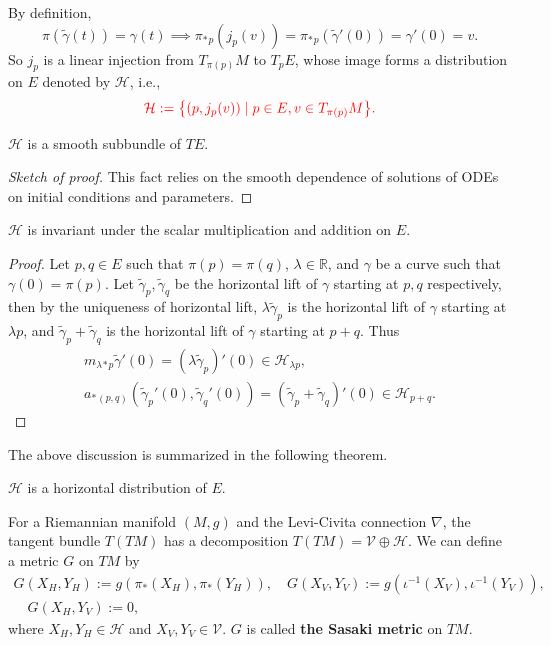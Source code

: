 By definition, 
\begin{equation*}
    \pi(\tilde{\gamma}(t)) = \gamma(t) \implies \pi_*{}_p(j_p(v)) = \pi_*{}_p(\tilde{\gamma}'(0)) = \gamma'(0) = v.
\end{equation*}
So $j_p$ is a linear injection from $T_{\pi(p)} M$ to $T_p E$, 
whose image forms a distribution on $E$ denoted by $\mathcal{H}$, i.e., 
\begin{equation*}
    \textcolor{red}{\mathcal{H} := \big\{(p,j_p(v))\mid p\in E, v\in T_{\pi(p)} M\big\}.}
\end{equation*}
\begin{fact}
    $\mathcal{H}$ is a smooth subbundle of $TE$. 
\end{fact}
\begin{proof}[Sketch of proof]
    This fact relies on the smooth dependence of solutions of ODEs on initial conditions and parameters.
\end{proof}
\begin{fact}
    $\mathcal{H}$ is invariant under the scalar multiplication and addition on $E$.
\end{fact}
\begin{proof}
    Let $p,q\in E$ such that $\pi(p) = \pi(q)$, $\lambda\in \mathbb{R}$, and $\gamma$ be a curve such that $\gamma(0) = \pi(p)$. 
    Let $\tilde{\gamma}_p,\tilde{\gamma}_q$ be the horizontal lift of $\gamma$ starting at $p,q$ respectively, 
    then by the uniqueness of horizontal lift, $\lambda \tilde{\gamma}_p$ is the horizontal lift of $\gamma$ starting at $\lambda p$,
    and $\tilde{\gamma}_p + \tilde{\gamma}_q$ is the horizontal lift of $\gamma$ starting at $p+q$. Thus 
    \begin{gather*}
        m_{\lambda}{}_*{}_p \tilde{\gamma}'(0) = (\lambda \tilde{\gamma}_p)'(0) \in \mathcal{H}_{\lambda p}, \\
        a_*{}_{(p,q)}(\tilde{\gamma}_p'(0), \tilde{\gamma}_q'(0)) = (\tilde{\gamma}_p + \tilde{\gamma}_q)'(0) \in \mathcal{H}_{p+q}.
    \end{gather*}
\end{proof}
The above discussion is summarized in the following theorem.
\begin{theorem}
    $\mathcal{H}$ is a horizontal distribution of $E$. 
\end{theorem}
\begin{example}
    For a Riemannian manifold $(M,g)$ and the Levi-Civita connection $\nabla$, 
    the tangent bundle $T(TM)$ has a decomposition $T(TM) = \mathcal{V}\oplus\mathcal{H}$. 
    We can define a metric $G$ on $TM$ by
    \begin{gather*}
        G(X_H,Y_H):= g(\pi_*(X_H), \pi_*(Y_H)), \quad G(X_V,Y_V) := g(\iota^{-1}(X_V), \iota^{-1}(Y_V)), \\
        \quad G(X_H,Y_V) := 0,
    \end{gather*} 
    where $X_H,Y_H\in \mathcal{H}$ and $X_V,Y_V\in \mathcal{V}$. 
    $G$ is called \textbf{the Sasaki metric} on $TM$.
\end{example}

